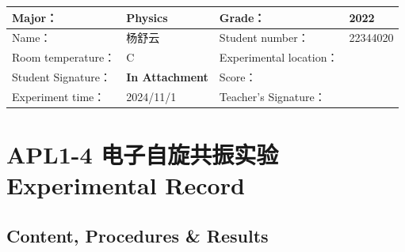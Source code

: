 
\begin{table}
	\renewcommand\arraystretch{1.7}
	\centering
	\begin{tabularx}{\textwidth}{|X|X|X|X|}
		\hline
		Major： & Physics & Grade： & 2022 \\
		\hline
		Name： & 杨舒云 & Student number： & 22344020\\
		\hline
		Room temperature： & \degree C & Experimental location： &  \\
		\hline
		Student Signature：& \textbf{In Attachment} & Score： &\\
		\hline
		Experiment time：& 2024/11/1 & Teacher's Signature：&\\
		\hline
	\end{tabularx}
\end{table}
\section{APL1-4 电子自旋共振实验 \\ Experimental Record}


\subsection{Content, Procedures \& Results}

